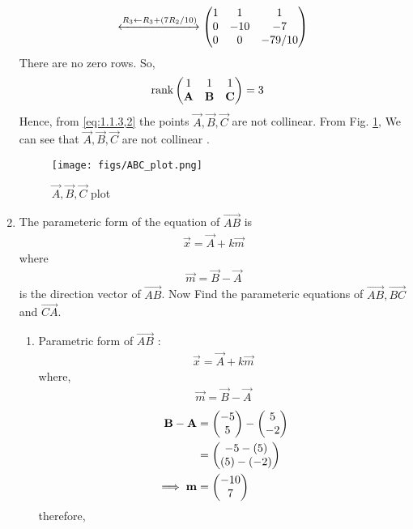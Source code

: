 \documentclass[10pt]{book}
\begin{document}
\begin{enumerate}[label=\thesection.\arabic*.,ref=\thesection.\theenumi]
\begin{align}
     \xleftrightarrow[]{R_3\leftarrow R_3+(7R_2/10)}
    \begin{pmatrix}
    1 & 1 & 1
    \\
    0 & -10 & -7
    \\    
    0 & 0 & -79/10
    \end{pmatrix}
\end{align}
There are no zero rows. So,
\begin{align}
    \text{rank}\begin{pmatrix}
    1 & 1 & 1\\
    \mathbf{A} & \mathbf{B} & \mathbf{C}\\
    \end{pmatrix} &= 3
\end{align}
Hence, from \eqref{eq:1.1.3,2} the points $\vec{A},\vec{B},\vec{C}$ are not collinear.
From Fig. \ref{fig1:Triangle}, We can see that $\vec{A},\vec{B},\vec{C}$ are not collinear .
\begin{figure}[H]
\centering
\texttt{[image: figs/ABC\_plot.png]}
\caption{$\vec{A},\vec{B},\vec{C}$ plot}
\label{fig1:Triangle}
\end{figure}
\item The parameteric form of the equation  of $\vec{AB}$ is
                \begin{align}
                \label{eq:geo-param}
                \vec{x}=\vec{A}+k\vec{m}
                \end{align}
                where
                \begin{align}
		\vec{m}=\vec{B}-\vec{A}
                \end{align}
is the direction vector of $\vec{AB}$. Now Find the parameteric equations of $\vec{AB}, \vec{BC}$ and $\vec{CA}$.
\\  
\solution 
\begin{enumerate}
\item Parametric form of $\vec{AB}$ :
\begin{align}
\vec{x} = \vec{A} + k\vec{m}
\end{align}
where,
\begin{align}
\vec{m} = \vec{B} - \vec{A}
\end{align}
\begin{align}
\mathbf{B} - \mathbf{A} &= \begin{pmatrix}-5\\5\end{pmatrix} - \begin{pmatrix} 5\\-2\end{pmatrix}\\
&= \begin{pmatrix}-5-(5) \\ (5)-(-2)\end{pmatrix}\\
\implies \mathbf {m} &= \begin{pmatrix}-10\\7\end{pmatrix}
\end{align}
therefore,
\begin{align}

\end{align}
\end{enumerate}
\end{enumerate}
\end{document}
